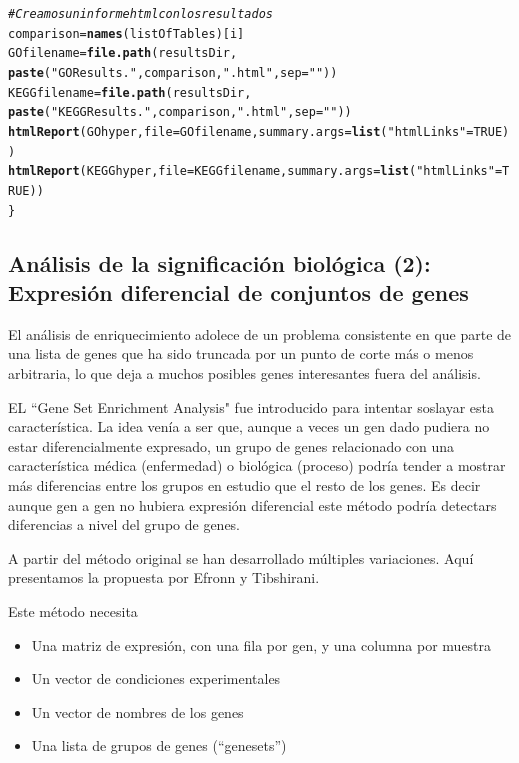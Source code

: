 \documentclass[a4paper]{article}\usepackage[]{graphicx}\usepackage[]{color}
\makeatletter
\newcommand{\hlnum}[1]{\textcolor[rgb]{0.686,0.059,0.569}{#1}}%
\newcommand{\hlstr}[1]{\textcolor[rgb]{0.192,0.494,0.8}{#1}}%
\newcommand{\hlcom}[1]{\textcolor[rgb]{0.678,0.584,0.686}{\textit{#1}}}%
\newcommand{\hlstd}[1]{\textcolor[rgb]{0.345,0.345,0.345}{#1}}%
\newcommand{\hlkwb}[1]{\textcolor[rgb]{0.69,0.353,0.396}{#1}}%
\newcommand{\hlkwc}[1]{\textcolor[rgb]{0.333,0.667,0.333}{#1}}%
\newcommand{\hlkwd}[1]{\textcolor[rgb]{0.737,0.353,0.396}{\textbf{#1}}}%
\newenvironment{kframe}{%
 \def\at@end@of@kframe{}%
 \ifinner\ifhmode%
  \def\at@end@of@kframe{\end{minipage}}%
  \begin{minipage}{\columnwidth}%
 \fi\fi%
 \def\FrameCommand##1{\hskip\@totalleftmargin \hskip-\fboxsep
 \colorbox{shadecolor}{##1}\hskip-\fboxsep
     \hskip-\linewidth \hskip-\@totalleftmargin \hskip\columnwidth}%
 \MakeFramed {\advance\hsize-\width
   \@totalleftmargin\z@ \linewidth\hsize
   \@setminipage}}%
 {\par\unskip\endMakeFramed%
 \at@end@of@kframe}
\newenvironment{knitrout}{}{} %
\makeatother
\begin{document}
\begin{knitrout}
\begin{kframe}
\begin{alltt}
\hlcom{# Creamos un informe html con los resultados}
   \hlstd{comparison} \hlkwb{=} \hlkwd{names}\hlstd{(listOfTables)[i]}
   \hlstd{GOfilename} \hlkwb{=}\hlkwd{file.path}\hlstd{(resultsDir,}
     \hlkwd{paste}\hlstd{(}\hlstr{"GOResults."}\hlstd{,comparison,}\hlstr{".html"}\hlstd{,} \hlkwc{sep}\hlstd{=}\hlstr{""}\hlstd{))}
   \hlstd{KEGGfilename} \hlkwb{=}\hlkwd{file.path}\hlstd{(resultsDir,}
     \hlkwd{paste}\hlstd{(}\hlstr{"KEGGResults."}\hlstd{,comparison,}\hlstr{".html"}\hlstd{,} \hlkwc{sep}\hlstd{=}\hlstr{""}\hlstd{))}
  \hlkwd{htmlReport}\hlstd{(GOhyper,} \hlkwc{file} \hlstd{= GOfilename,} \hlkwc{summary.args}\hlstd{=}\hlkwd{list}\hlstd{(}\hlstr{"htmlLinks"}\hlstd{=}\hlnum{TRUE}\hlstd{))}
  \hlkwd{htmlReport}\hlstd{(KEGGhyper,} \hlkwc{file} \hlstd{= KEGGfilename,} \hlkwc{summary.args}\hlstd{=}\hlkwd{list}\hlstd{(}\hlstr{"htmlLinks"}\hlstd{=}\hlnum{TRUE}\hlstd{))}
\hlstd{\}}
\end{alltt}
\end{kframe}
\end{knitrout}

\subsection{Análisis de la significación biológica (2): Expresión diferencial de conjuntos de genes}

El análisis de enriquecimiento adolece de un problema consistente en que parte de una lista de genes que ha sido truncada por un punto de corte más o menos arbitraria, lo que deja a muchos posibles genes interesantes fuera del análisis.

EL ``Gene Set Enrichment Analysis" fue introducido para intentar soslayar esta característica. La idea venía a ser que, aunque a veces un gen dado pudiera no estar diferencialmente expresado, un grupo de genes relacionado con una característica médica (enfermedad) o biológica (proceso) podría tender a mostrar más diferencias entre los grupos en estudio que el resto de los genes. Es decir aunque gen a gen no hubiera expresión diferencial este método podría detectars diferencias a nivel del grupo de genes.

A partir del método original se han desarrollado múltiples variaciones. 
Aquí presentamos la propuesta por Efronn y Tibshirani.

Este método necesita
\begin{itemize}
  \item Una matriz de expresión, con una fila por gen, y una columna por muestra
  \item Un vector de condiciones experimentales
  \item Un vector de nombres de los genes
  \item Una lista de grupos de genes (``genesets'')
\end{itemize}
\end{document}
